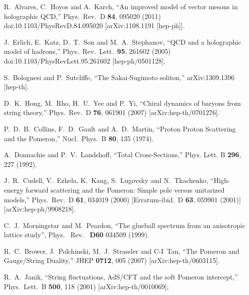 \documentclass[aps, prd, preprintnumbers, floatfix, showpacs, showkeys, nofootinbib, 10pt]{revtex4-1}
\begin{document}
\begin{references}
  R.~Alvares, C.~Hoyos and A.~Karch,
  ``An improved model of vector mesons in holographic QCD,''
  Phys.\ Rev.\ D {\bf 84}, 095020 (2011)
  doi:10.1103/PhysRevD.84.095020
  [arXiv:1108.1191 [hep-ph]].

  J.~Erlich, E.~Katz, D.~T.~Son and M.~A.~Stephanov,
  ``QCD and a holographic model of hadrons,''
  Phys.\ Rev.\ Lett.\  {\bf 95}, 261602 (2005)
  doi:10.1103/PhysRevLett.95.261602
  [hep-ph/0501128].

  S.~Bolognesi and P.~Sutcliffe,
  ``The Sakai-Sugimoto soliton,''
  arXiv:1309.1396 [hep-th].

  D.~K.~Hong, M.~Rho, H.~U.~Yee and P.~Yi,
  ``Chiral dynamics of baryons from string theory,''
  Phys.\ Rev.\  D {\bf 76}, 061901 (2007)
  [arXiv:hep-th/0701276].


 P.~D.~B.~Collins, F.~D.~Gault and A.~D.~Martin,
 ``Proton Proton Scattering and the Pomeron,''
Nucl.\ Phys.\  B {\bf 80}, 135 (1974).

A.~Donnachie and P.~V.~Landshoff, 
``Total Cross-Sections,'' 
Phys. Lett. B {\bf 296}, 227 (1992).

J.~R.~Cudell, V.~Ezhela, K.~Kang, S.~Lugovsky and N.~Tkachenko,
``High-energy forward scattering and the Pomeron: Simple pole versus
unitarized models,''
Phys.\ Rev.\  D {\bf 61}, 034019 (2000)
[Erratum-ibid.\  D {\bf 63}, 059901 (2001)]
[arXiv:hep-ph/9908218].


C.~J.~Morningstar and M.~Peardon, 
``The glueball spectrum from an anisotropic lattice study'',
Phys. \ Rev. \ {\bf D60} 034509 (1999).


R.~C.~Brower, J.~Polchinski, M.~J.~Strassler and C-I~Tan,
``The Pomeron and Gauge/String Duality,''
JHEP {\bf 0712}, 005 (2007)
[arXiv:hep-th/0603115].

  R.~A.~Janik,
  ``String fluctuations, AdS/CFT and the soft Pomeron intercept,''
  Phys.\ Lett.\  B {\bf 500}, 118 (2001)
  [arXiv:hep-th/0010069];


\end{references}
\end{document}
